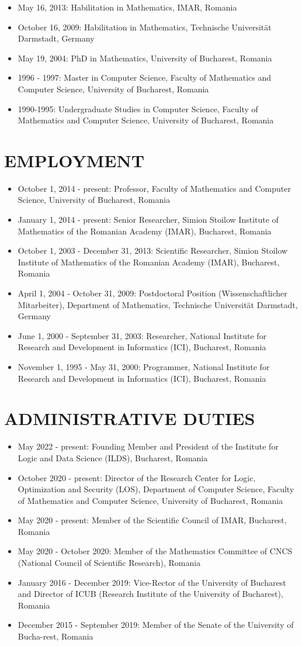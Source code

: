 \documentclass[12pt]{article}
\newcommand{\ici}{National Institute for Research and Development in
  Informatics (ICI), Bucharest}
\newcommand{\imar}{Simion Stoilow Institute of Mathematics  of the Romanian Academy (IMAR)}
\newcommand{\tud}{Technische Universit\" at Darmstadt, Germany}
\begin{document}
\begin{itemize}
\item May 16, 2013: 
Habilitation in Mathematics, IMAR, Romania
\item October 16, 2009: Habilitation in Mathematics, \tud
\item  May 19, 2004:  PhD in Mathematics, University of Bucharest, Romania
\item 1996 - 1997: Master in Computer Science, Faculty of Mathematics and Computer Science, University of Bucharest, Romania
\item 1990-1995: Undergraduate Studies in Computer Science,
Faculty of Mathematics and Computer Science,  University of Bucharest, Romania
\end{itemize}


\section*{EMPLOYMENT}
\begin{itemize}
\item October 1, 2014 - present: Professor, Faculty of Mathematics and Computer Science, University of Bucharest, Romania
\item January 1, 2014 - present: Senior Researcher,  \imar, Bucharest, Romania
\item October 1, 2003 -  December 31, 2013:
Scientific Researcher,  \imar, Bucharest, Romania
\item April 1, 2004 - October 31, 2009:
Postdoctoral Position (Wissenschaftlicher Mitarbeiter), Department of Mathematics, Technische Universit\" at Darmstadt, Germany 
\item June 1, 2000 - September 31, 2003:
Researcher,  \ici, Romania 
\item November 1, 1995 - May 31, 2000:
Programmer, \ici, Romania
\end{itemize}

\section*{ADMINISTRATIVE DUTIES}
\begin{itemize}
\item May 2022 - present: Founding Member and President of the Institute for Logic and Data Science (ILDS), Bucharest, Romania
\item October 2020 - present: Director of the Research Center for Logic, Optimization and Security (LOS), Department of Computer Science, 
Faculty of Mathematics and Computer Science, University of Bucharest, Romania
\item May 2020 - present: Member of the Scientific Council of IMAR, Bucharest, Romania
\item May 2020 - October 2020: Member of the Mathematics Committee of CNCS (National Council of Scientific Research), Romania
\item January  2016 - December 2019: Vice-Rector of the University of Bucharest and Director  of 
ICUB (Research Institute of the University of Bucharest), Romania
\item December 2015 - September 2019: Member of the Senate of the University of Bucha-rest, Romania
\end{itemize}
\end{document}
